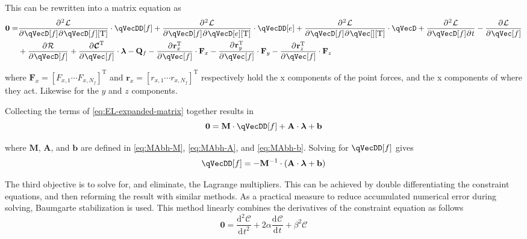 \documentclass[11pt]{article}
\newcommand{\oD}[2]{
    \frac{\mathrm{d}\mspace{1mu}#1}{\mathrm{d}\mspace{1mu}#2}
}
\newcommand{\oDD}[2]{
    \frac{\mathrm{d}^{2}\mspace{1mu}#1}{\mathrm{d}\mspace{1mu}#2^2}
}
\newcommand{\pD}[2]{
    \frac{\partial\mspace{1mu}#1}{\partial\mspace{1mu}#2}
}
\newcommand{\pDD}[3]{
    \frac{\partial{^{\mspace{1mu}2}}\mspace{1mu}#1}{\partial\mspace{1mu}#2\mspace{1mu}\partial\mspace{1mu}#3}
}
\begin{document}
This can be rewritten into a matrix equation as
\begin{align} \label{eq:EL-expanded-matrix}
    \mathbf{0} =
    &\pDD{\mathcal{L}}{\qVecD[f]}{\qVecD[f][\mathrm{T}]} \cdot \qVecDD[f]
    + \pDD{\mathcal{L}}{\qVecD[f]}{\qVecD[e][\mathrm{T}]} \cdot \qVecDD[e]
    + \pDD{\mathcal{L}}{\qVecD[f]}{\qVec[][\mathrm{T}]} \cdot \qVecD
    + \pDD{\mathcal{L}}{\qVecD[f]}{t}
    - \pD{\mathcal{L}}{\qVec[f]} \nonumber\\
    &+ \pD{\mathcal{R}}{\qVecD[f]}
    + \pD{\bm{\mathcal{C}}^{\mathrm{T}}}{\qVec[f]} \cdot \bm{\lambda}
    - \mathbf{Q}_f
    - \pD{\mathbf{r}_x^{\mathrm{T}}}{\qVec[f]} \cdot \mathbf{F}_x
    - \pD{\mathbf{r}_y^{\mathrm{T}}}{\qVec[f]} \cdot \mathbf{F}_y
    - \pD{\mathbf{r}_z^{\mathrm{T}}}{\qVec[f]} \cdot \mathbf{F}_z
\end{align}

where $\mathbf{F}_x=[F_{x,1} \cdots F_{x,N_f}]^{\mathrm{T}}$ and $\mathbf{r}_x=[r_{x,1} \cdots r_{x,N_f}]^{\mathrm{T}}$ respectively hold the x components of the point forces, and the x components of where they act. Likewise for the $y$ and $z$ components.

Collecting the terms of \eqref{eq:EL-expanded-matrix} together results in
\begin{equation} \label{eq:EL-collected}
    \mathbf{0} = \mathbf{M} \cdot \qVecDD[f]
    + \mathbf{A} \cdot \bm{\lambda}
    + \mathbf{b}
\end{equation}

where $\mathbf{M}$, $\mathbf{A}$, and $\mathbf{b}$ are defined in \eqref{eq:MAbh-M}, \eqref{eq:MAbh-A}, and \eqref{eq:MAbh-b}. Solving for $\qVecDD[f]$ gives
\begin{equation} \label{eq:EL-solved}
    \qVecDD[f] = - \mathbf{M}^{-1} \cdot \del{\mathbf{A} \cdot \bm{\lambda} + \mathbf{b}}
\end{equation}

The third objective is to solve for, and eliminate, the Lagrange multipliers. This can be achieved by double differentiating the constraint equations, and then reforming the result with similar methods. As a practical measure to reduce accumulated numerical error during solving, Baumgarte stabilization \cite{RF1-15} is used. This method linearly combines the derivatives of the constraint equation as follows
\begin{equation} \label{eq:C-stabilised}
    \mathbf{0} = \oDD{\bm{\mathcal{C}}}{t} + 2\alpha\oD{\bm{\mathcal{C}}}{t} + \beta^2\bm{\mathcal{C}}
\end{equation}
\end{document}
